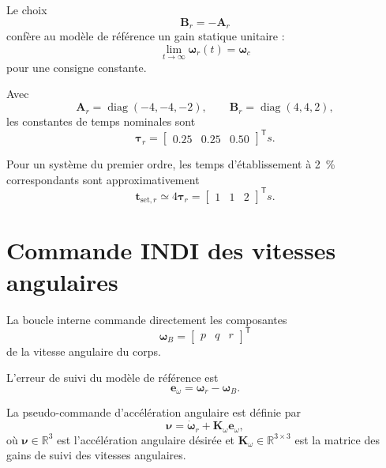 \documentclass[11pt,a4paper,oneside]{report}
\newcommand{\vect}[1]{\bm{#1}}
\newcommand{\mat}[1]{\bm{#1}}
\newcommand{\trans}{^{\mathsf T}}
\newcommand{\diag}{\operatorname{diag}}
\begin{document}
Le choix
\begin{equation}
	\mat B_r=-\mat A_r
	\label{eq_reference_model_unity_gain}
\end{equation}
confère au modèle de référence un gain statique unitaire :
\begin{equation}
	\lim_{t\rightarrow\infty}\vect\omega_r(t)
	=
	\vect\omega_c
\end{equation}
pour une consigne constante.

Avec
\begin{equation}
	\mat A_r
	=
	\diag(-4,-4,-2),
	\qquad
	\mat B_r
	=
	\diag(4,4,2),
	\label{eq_reference_model_matrices}
\end{equation}
les constantes de temps nominales sont
\begin{equation}
	\vect\tau_r
	=
	\begin{bmatrix}
		0.25 & 0.25 & 0.50
	\end{bmatrix}\trans
	\si{s}.
	\label{eq_reference_model_time_constants}
\end{equation}

Pour un système du premier ordre, les temps d'établissement à \SI{2}{\percent} correspondants sont approximativement
\begin{equation}
	\vect t_{\mathrm{set},r}
	\simeq
	4\vect\tau_r
	=
	\begin{bmatrix}
		1 & 1 & 2
	\end{bmatrix}\trans
	\si{s}.
	\label{eq_reference_model_settling_times}
\end{equation}

\section{Commande INDI des vitesses angulaires}

La boucle interne commande directement les composantes
\[
\vect\omega_B
=
\begin{bmatrix}
	p & q & r
\end{bmatrix}\trans
\]
de la vitesse angulaire du corps.

L'erreur de suivi du modèle de référence est
\begin{equation}
	\vect e_\omega
	=
	\vect\omega_r-\vect\omega_B.
	\label{eq_indi_body_rate_error}
\end{equation}

La pseudo-commande d'accélération angulaire est définie par
\begin{equation}
	\vect\nu
	=
	\dot{\vect\omega}_r
	+
	\mat K_\omega\vect e_\omega,
	\label{eq_pseudocontrol}
\end{equation}
où $\vect\nu\in\mathbb{R}^3$ est l'accélération angulaire désirée et $\mat K_\omega\in\mathbb{R}^{3\times3}$ est la matrice des gains de suivi des vitesses angulaires.
\end{document}
